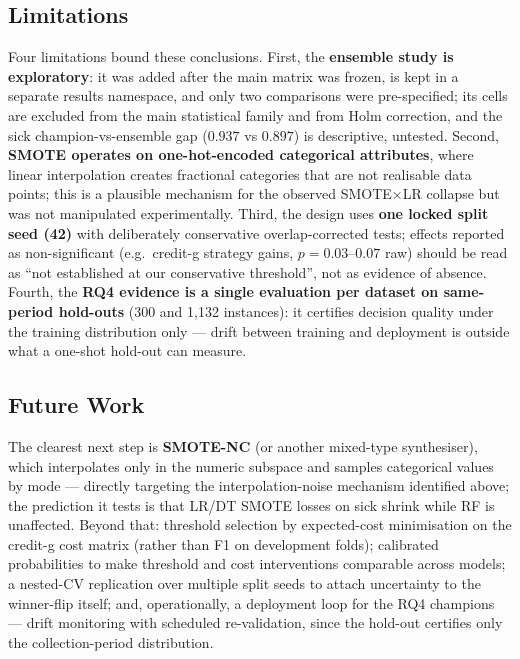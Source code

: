 \subsection{Limitations}

Four limitations bound these conclusions. First, the \textbf{ensemble study is exploratory}: it was added after the main matrix was frozen, is kept in a separate results namespace, and only two comparisons were pre-specified; its cells are excluded from the main statistical family and from Holm correction, and the sick champion-vs-ensemble gap ($0.937$ vs $0.897$) is descriptive, untested. Second, \textbf{SMOTE operates on one-hot-encoded categorical attributes}, where linear interpolation creates fractional categories that are not realisable data points; this is a plausible mechanism for the observed SMOTE$\times$LR collapse but was not manipulated experimentally. Third, the design uses \textbf{one locked split seed (42)} with deliberately conservative overlap-corrected tests; effects reported as non-significant (e.g.\ credit-g strategy gains, $p=0.03$--$0.07$ raw) should be read as ``not established at our conservative threshold'', not as evidence of absence. Fourth, the \textbf{RQ4 evidence is a single evaluation per dataset on same-period hold-outs} (300 and 1{,}132 instances): it certifies decision quality under the training distribution only --- drift between training and deployment is outside what a one-shot hold-out can measure.

\subsection{Future Work}

The clearest next step is \textbf{SMOTE-NC} (or another mixed-type synthesiser), which interpolates only in the numeric subspace and samples categorical values by mode --- directly targeting the interpolation-noise mechanism identified above; the prediction it tests is that LR/DT SMOTE losses on sick shrink while RF is unaffected. Beyond that: threshold selection by expected-cost minimisation on the credit-g cost matrix (rather than F1 on development folds); calibrated probabilities to make threshold and cost interventions comparable across models; a nested-CV replication over multiple split seeds to attach uncertainty to the winner-flip itself; and, operationally, a deployment loop for the RQ4 champions --- drift monitoring with scheduled re-validation, since the hold-out certifies only the collection-period distribution.
